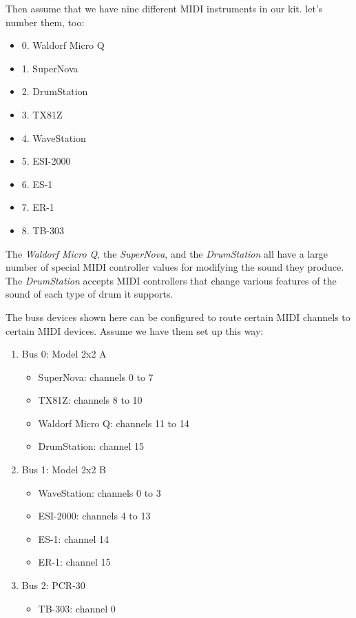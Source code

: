    Then assume that we have nine different MIDI instruments in our kit.
   let's number them, too:

   \begin{itemize}
      \item 0. Waldorf Micro Q
      \item 1. SuperNova
      \item 2. DrumStation
      \item 3. TX81Z
      \item 4. WaveStation
      \item 5. ESI-2000
      \item 6. ES-1
      \item 7. ER-1
      \item 8. TB-303
   \end{itemize}

   The \textsl{Waldorf Micro Q},
   the \textsl{SuperNova},
   and the \textsl{DrumStation} all have a large
   number of special MIDI controller values for modifying the sound they
   produce.
   The \textsl{DrumStation} accepts MIDI controllers that change various
   features of the sound of each type of drum it supports.

   The buss devices shown here can be configured to route certain
   MIDI channels to certain MIDI devices.  Assume we have them
   set up this way:

   \begin{enumerate}
      \item Bus 0: Model 2x2 A
      \begin{itemize}
         \item SuperNova: channels 0 to 7
         \item TX81Z: channels 8 to 10
         \item Waldorf Micro Q: channels 11 to 14
         \item DrumStation: channel 15
      \end{itemize}
      \item Bus 1: Model 2x2 B
      \begin{itemize}
         \item WaveStation: channels 0 to 3
         \item ESI-2000: channels 4 to 13
         \item ES-1: channel 14
         \item ER-1: channel 15
      \end{itemize}
      \item Bus 2: PCR-30
      \begin{itemize}
         \item TB-303: channel 0
      \end{itemize}
   \end{enumerate}

